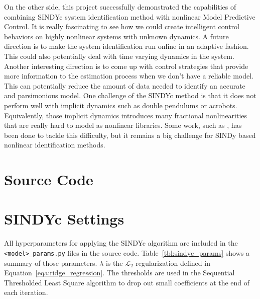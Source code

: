 \documentclass[10pt,twocolumn]{article}
\begin{document}
On the other side, this project successfully demonstrated
the capabilities of combining SINDYc system identification method with nonlinear
Model Predictive Control. It is really fascinating to see how we could create intelligent control
behaviors on highly nonlinear systems with unknown dynamics. A future direction is to make
the system identification run online in an adaptive fashion. This could also potentially deal
with time varying dynamics in the system. Another interesting direction is to come up
with control strategies that provide more information to the estimation process when
we don't have a reliable model. This can potentially reduce the amount of data needed to
identify an accurate and parsimonious model. One challenge of the SINDYc method is that
it does not perform well with implicit dynamics such as double pendulums or acrobots.
Equivalently, those implicit dynamics introduces many fractional nonlinearities that
are really hard to model as nonlinear libraries. Some work, such as \cite{implicitsindy},
has been done to tackle this difficulty, but it remains a big challenge for SINDy based
nonlinear identification methods.

\newpage



\newpage
\onecolumn
\appendix
\appendixpage

\section{Source Code}

\section{SINDYc Settings}\label{sec:hyper_sindy}

All hyperparameters for applying the SINDYc algorithm are included
in the \texttt{<model>\_params.py} files in the source code. Table~\ref{tbl:sindyc_params}
shows a summary of those parameters. $\lambda$ is the $\mathcal{L}_2$ regularization
defined in Equation~\ref{eqa:ridge_regression}. The thresholds are used in the
Sequential Thresholded Least Square algorithm to drop out small coefficients at the end of
each iteration.
\end{document}
